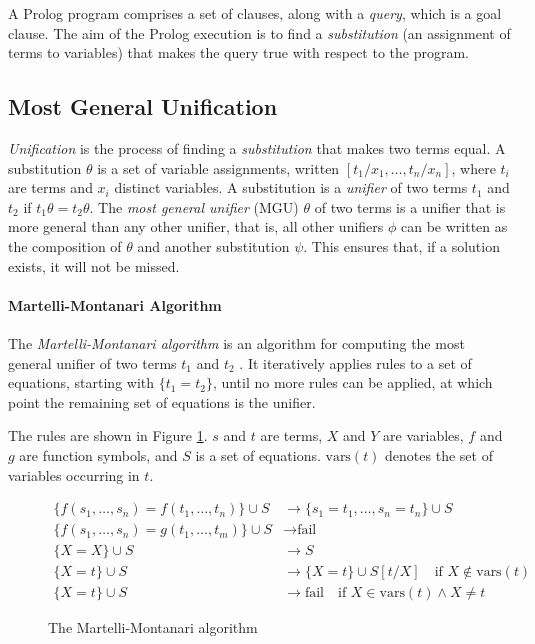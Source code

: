 A Prolog program comprises a set of clauses, along with a \emph{query}, which is a goal clause. The aim of the Prolog execution is to find a \emph{substitution} (an assignment of terms to variables) that makes the query true with respect to the program.

\subsection{Most General Unification}

\emph{Unification} is the process of finding a \emph{substitution} that makes two terms equal. A substitution $\theta$ is a set of variable assignments, written $[t_1/x_1, \ldots, t_n/x_n]$, where $t_i$ are terms and $x_i$ distinct variables. A substitution is a \emph{unifier} of two terms $t_1$ and $t_2$ if $t_1\theta = t_2\theta$. The \emph{most general unifier} (MGU) $\theta$ of two terms is a unifier that is more general than any other unifier, that is, all other unifiers $\phi$ can be written as the composition of $\theta$ and another substitution $\psi$. This ensures that, if a solution exists, it will not be missed.

\paragraph{Martelli-Montanari Algorithm}

The \emph{Martelli-Montanari algorithm} is an algorithm for computing the most general unifier of two terms $t_1$ and $t_2$ \cite{martelliEfficientUnificationAlgorithm1982}. It iteratively applies rules to a set of equations, starting with $\{t_1 = t_2\}$, until no more rules can be applied, at which point the remaining set of equations is the unifier.

The rules are shown in Figure \ref{fig:martelli-montanari}. $s$ and $t$ are terms, $X$ and $Y$ are variables, $f$ and $g$ are function symbols, and $S$ is a set of equations. $\text{vars}(t)$ denotes the set of variables occurring in $t$.

\begin{figure}[H]
\begin{align*}
\{f(s_1, \ldots, s_n) = f(t_1, \ldots, t_n)\} \cup S &\rightarrow \{s_1 = t_1, \ldots, s_n = t_n\} \cup S \\
\{f(s_1, \ldots, s_n) = g(t_1, \ldots, t_m)\} \cup S &\rightarrow \text{fail} \\
\{X = X\} \cup S &\rightarrow S \\
\{X = t\} \cup S &\rightarrow \{X = t\} \cup S[t/X] \quad \text{if } X \notin \text{vars}(t) \\
\{X = t\} \cup S &\rightarrow \text{fail} \quad \text{if } X \in \text{vars}(t) \land X \neq t
\end{align*}
\caption{The Martelli-Montanari algorithm}
\label{fig:martelli-montanari}
\end{figure}

